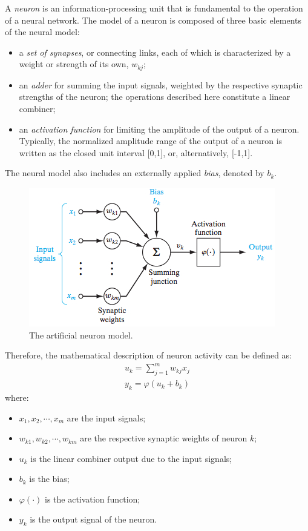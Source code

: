 A \textit{neuron} is an information-processing unit that is fundamental to the operation of a neural network.
The model of a neuron is composed of three basic elements of the neural model:
\begin{itemize}
\item a \textit{set of synapses}, or connecting links, each of which is characterized by a weight or strength of its own, $w_{kj}$;
\item an \textit{adder} for summing the input signals, weighted by the respective synaptic strengths of the neuron; the operations described here constitute a linear combiner;
\item an \textit{activation function} for limiting the amplitude of the output of a neuron. Typically, the normalized amplitude range of the output of a neuron is written as the closed unit interval [0,1], or, alternatively, [-1,1].
\end{itemize}
The neural model also includes an externally applied \textit{bias}, denoted by $b_k$.

\begin{figure}[t]
\centering
\includegraphics[width=0.8\linewidth]{img/NeuronModel.jpg}
\caption{The artificial neuron model.}
\end{figure}

Therefore, the mathematical description of neuron activity can be defined as:
\begin{eqnarray}
{ u }_{ k }=\sum _{ j=1 }^{ m }{ { w }_{ kj } } { x }_{ j }\\ 
{ y }_{ k }=\varphi \left( { u }_{ k }+b_{ k } \right)
\end{eqnarray}
where:
\begin{itemize}
\item ${ x }_{ 1 },{ x }_{ 2 },\cdots ,{ x }_{ m }$ are the input signals;
\item ${ w }_{ k1 },{ w }_{ k2 },\cdots ,{ w }_{ km }$ are the respective synaptic weights of neuron $k$;
\item $u_k$ is the linear combiner output due to the input signals;
\item $b_k$ is the bias;
\item $\varphi(\cdot)$ is the activation function;
\item $y_k$ is the output signal of the neuron.
\end{itemize}

